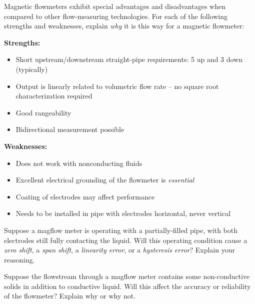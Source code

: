 

Magnetic flowmeters exhibit special advantages and disadvantages when compared to other flow-measuring technologies.  For each of the following strengths and weaknesses, explain {\it why} it is this way for a magnetic flowmeter:

\vskip 10pt

{\bf Strengths:}

\begin{itemize}
\item{} Short upstream/downstream straight-pipe requirements: 5 up and 3 down (typically)
\item{} Output is linearly related to volumetric flow rate -- no square root characterization required
\item{} Good rangeability
\item{} Bidirectional measurement possible
\end{itemize}

\vskip 10pt

{\bf Weaknesses:}

\begin{itemize}
\item{} Does not work with nonconducting fluids
\item{} Excellent electrical grounding of the flowmeter is {\it essential}
\item{} Coating of electrodes may affect performance
\item{} Needs to be installed in pipe with electrodes horizontal, never vertical
\end{itemize}

\vskip 10pt

Suppose a magflow meter is operating with a partially-filled pipe, with both electrodes still fully contacting the liquid.  Will this operating condition cause a {\it zero shift}, a {\it span shift}, a {\it linearity error}, or a {\it hysteresis error}?  Explain your reasoning.

\vskip 10pt

Suppose the flowstream through a magflow meter contains some non-conductive solids in addition to conductive liquid.  Will this affect the accuracy or reliability of the flowmeter?  Explain why or why not.

\vskip 10pt

